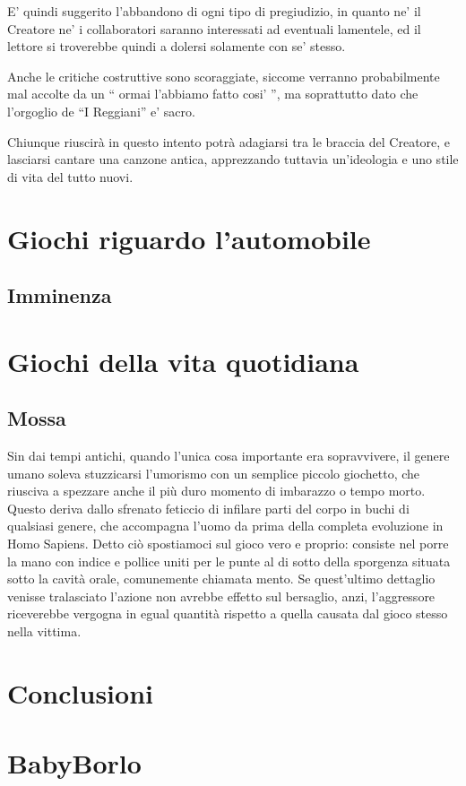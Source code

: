 \documentclass{article}
\begin{document}
E' quindi suggerito l'abbandono di ogni tipo di pregiudizio, in quanto ne' il Creatore ne' i collaboratori saranno interessati ad eventuali lamentele, ed il lettore si troverebbe quindi a dolersi solamente con se' stesso.

Anche le critiche costruttive sono scoraggiate, siccome verranno probabilmente mal accolte da un “ ormai l'abbiamo fatto cosi' ”, ma soprattutto dato che l'orgoglio de “I Reggiani” e' sacro.

Chiunque riuscirà in questo intento potrà adagiarsi tra le braccia del Creatore, e lasciarsi cantare una canzone antica, apprezzando tuttavia un'ideologia e uno stile di vita del tutto nuovi.

\newpage
\section{Giochi riguardo l'automobile}

\subsection{Imminenza}

\newpage
\section{Giochi della vita quotidiana}
\subsection{Mossa}
Sin dai tempi antichi, quando l'unica cosa importante era sopravvivere, il genere umano soleva stuzzicarsi l'umorismo con un semplice piccolo giochetto, che riusciva a spezzare anche il più duro momento di imbarazzo o tempo morto.
Questo deriva dallo sfrenato feticcio di infilare parti del corpo in buchi di qualsiasi genere, che accompagna l'uomo da prima della completa evoluzione in Homo Sapiens.
Detto ciò spostiamoci sul gioco vero e proprio: consiste nel porre la mano con indice e pollice uniti per le punte al di sotto della sporgenza situata sotto la cavità orale, comunemente chiamata mento.
Se quest'ultimo dettaglio venisse tralasciato l'azione non avrebbe effetto sul bersaglio, anzi, l'aggressore riceverebbe vergogna in egual quantità rispetto a quella causata dal gioco stesso nella vittima.
\newpage
\section{Conclusioni}

\newpage
\section{BabyBorlo}
\end{document}
